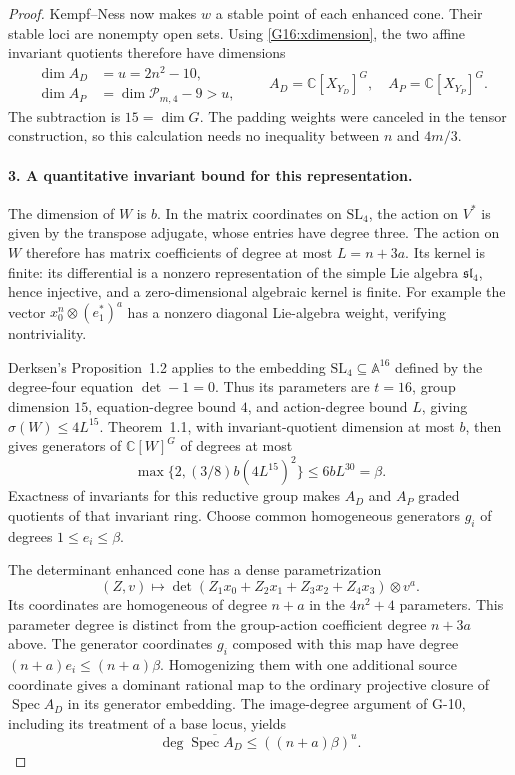 \documentclass[11pt,a4paper]{article}
\theoremstyle{definition}\newtheorem{definition}{Definition}
\begin{document}
\begin{proof}
Kempf--Ness now makes $w$ a stable point of each enhanced cone.
Their stable loci are nonempty open sets. Using
\eqref{G16:xdimension}, the two affine invariant quotients therefore
have dimensions
\begin{equation}\label{G16:quotdims}
 \begin{split}
 \dim A_D&=u=2n^2-10,\\
 \dim A_P&=\dim\mathcal P_{m,4}-9>u,
 \end{split}
 \qquad
 A_D=\mathbb C[X_{Y_D}]^G,\quad A_P=\mathbb C[X_{Y_P}]^G.
\end{equation}
The subtraction is $15=\dim G$. The padding weights were canceled
in the tensor construction, so this calculation needs no inequality
between $n$ and $4m/3$.

\paragraph{3. A quantitative invariant bound for this representation.}
The dimension of $W$ is $b$. In the matrix coordinates on
$\mathrm{SL}_4$, the action on $V^*$ is given by the transpose
adjugate, whose entries have degree three. The action on $W$
therefore has matrix coefficients of degree at most
$L=n+3a$. Its kernel is finite: its differential is a nonzero
representation of the simple Lie algebra $\mathfrak{sl}_4$, hence
injective, and a zero-dimensional algebraic kernel is finite.
For example the vector $x_0^n\otimes(e_1^*)^a$ has a nonzero
diagonal Lie-algebra weight, verifying nontriviality.

Derksen's Proposition~1.2 applies to the embedding
$\mathrm{SL}_4\subseteq\mathbb A^{16}$ defined by the degree-four
equation $\det-1=0$. Thus its parameters are $t=16$, group dimension
$15$, equation-degree bound $4$, and action-degree bound $L$, giving
$\sigma(W)\leq4L^{15}$.
Theorem~1.1, with invariant-quotient dimension at most $b$, then gives
generators of $\mathbb C[W]^G$ of degrees at most
\[
 \max\{2,(3/8)b(4L^{15})^2\}\leq6bL^{30}=\beta.
\]
Exactness of invariants for this reductive group makes $A_D$ and
$A_P$ graded quotients of that invariant ring. Choose common
homogeneous generators $g_i$ of degrees $1\leq e_i\leq\beta$.

The determinant enhanced cone has a dense parametrization
\[
 (Z,v)\longmapsto\det(Z_1x_0+Z_2x_1+Z_3x_2+Z_4x_3)\otimes v^a.
\]
Its coordinates are homogeneous of degree $n+a$ in the
$4n^2+4$ parameters. This parameter degree is distinct from the
group-action coefficient degree $n+3a$ above.
The generator coordinates $g_i$ composed with this map have degree
$(n+a)e_i\leq(n+a)\beta$.
Homogenizing them with one additional source coordinate gives a
dominant rational map to the ordinary projective closure of
$\operatorname{Spec}A_D$ in its generator embedding. The image-degree
argument of G-10, including its treatment of a base locus, yields
\[
 \deg\overline{\operatorname{Spec}A_D}
      \leq((n+a)\beta)^u.
\]


\end{proof}
\end{document}
